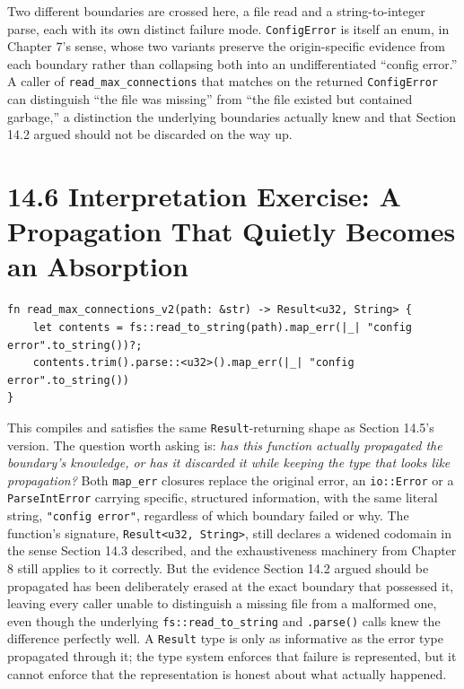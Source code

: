 \documentclass[11pt]{book}
\begin{document}
Two different boundaries are crossed here, a file read and a string-to-integer parse, each with its own distinct failure mode. \texttt{ConfigError} is itself an enum, in Chapter 7's sense, whose two variants preserve the origin-specific evidence from each boundary rather than collapsing both into an undifferentiated ``config error.'' A caller of \texttt{read\_max\_connections} that matches on the returned \texttt{ConfigError} can distinguish ``the file was missing'' from ``the file existed but contained garbage,'' a distinction the underlying boundaries actually knew and that Section 14.2 argued should not be discarded on the way up.

\section*{14.6 Interpretation Exercise: A Propagation That Quietly Becomes an Absorption}

\begin{lstlisting}
fn read_max_connections_v2(path: &str) -> Result<u32, String> {
    let contents = fs::read_to_string(path).map_err(|_| "config error".to_string())?;
    contents.trim().parse::<u32>().map_err(|_| "config error".to_string())
}
\end{lstlisting}

This compiles and satisfies the same \texttt{Result}-returning shape as Section 14.5's version. The question worth asking is: \emph{has this function actually propagated the boundary's knowledge, or has it discarded it while keeping the type that looks like propagation?} Both \texttt{map\_err} closures replace the original error, an \texttt{io::Error} or a \texttt{ParseIntError} carrying specific, structured information, with the same literal string, \texttt{"config error"}, regardless of which boundary failed or why. The function's signature, \texttt{Result<u32, String>}, still declares a widened codomain in the sense Section 14.3 described, and the exhaustiveness machinery from Chapter 8 still applies to it correctly. But the evidence Section 14.2 argued should be propagated has been deliberately erased at the exact boundary that possessed it, leaving every caller unable to distinguish a missing file from a malformed one, even though the underlying \texttt{fs::read\_to\_string} and \texttt{.parse()} calls knew the difference perfectly well. A \texttt{Result} type is only as informative as the error type propagated through it; the type system enforces that failure is represented, but it cannot enforce that the representation is honest about what actually happened.
\end{document}
